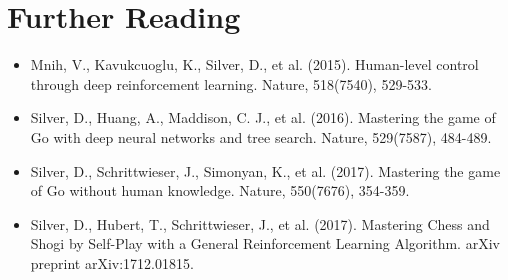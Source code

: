 \documentclass[11pt]{article}
\begin{document}
\section{Further Reading}
\begin{itemize}
    \item Mnih, V., Kavukcuoglu, K., Silver, D., et al. (2015). Human-level control through deep reinforcement learning. Nature, 518(7540), 529-533.
    
    \item Silver, D., Huang, A., Maddison, C. J., et al. (2016). Mastering the game of Go with deep neural networks and tree search. Nature, 529(7587), 484-489.
    
    \item Silver, D., Schrittwieser, J., Simonyan, K., et al. (2017). Mastering the game of Go without human knowledge. Nature, 550(7676), 354-359.
    
    \item Silver, D., Hubert, T., Schrittwieser, J., et al. (2017). Mastering Chess and Shogi by Self-Play with a General Reinforcement Learning Algorithm. arXiv preprint arXiv:1712.01815.
\end{itemize}
\end{document}
